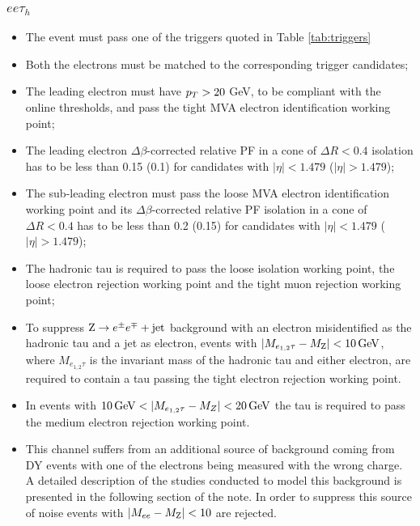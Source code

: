 \subsubsection{$ee\tau_h$}
\begin{itemize}
\item The event must pass one of the triggers quoted in Table \ref{tab:triggers} 
\item Both the electrons must be matched to the corresponding trigger candidates;
\item The leading electron must have $p_{T} > 20$ GeV, to be compliant with the online thresholds, and pass the tight MVA electron identification working point;
\item The leading electron $\Delta \beta$-corrected relative PF in a cone of $\Delta R < 0.4$ isolation has to be less than 0.15 (0.1) for candidates with $|\eta| < 1.479$ ($|\eta| > 1.479$);
\item The sub-leading electron must pass the loose MVA electron identification working point and its $\Delta \beta$-corrected relative PF isolation in a cone of $\Delta R < 0.4$ has to be less than 0.2 (0.15) for candidates with $|\eta| < 1.479$ ($|\eta| > 1.479$);
\item The hadronic tau is required to pass the loose isolation working point, the loose electron rejection working point and the tight muon rejection working point;
\item To suppress $\mathrm{Z}\rightarrow e^\pm e^\mp+\mathrm{jet}$ background with an electron misidentified as the hadronic tau and a jet as electron, events with $|M_{e_{1,2}\tau} - M_{\mathrm{Z}}| < 10\, \mathrm{GeV}$, where $M_{e_{1,2}\tau}$ is the invariant mass of the hadronic tau and either electron, are required to contain a tau passing the tight electron rejection working point.                                                                         
\item In events with $10\, \mathrm{GeV} < |M_{e_{1,2}\tau} - M_Z| < 20\, \mathrm{GeV}$ the tau is required to pass the medium electron rejection working point.                                                               
\item This channel suffers from an additional source of background coming from DY events with one of the electrons being measured with the wrong charge. A detailed                                      
description of the studies conducted to model this background is presented in the following section of the note. In order to suppress this source of noise events with $|M_{ee} - M_{\mathrm{Z}}| < 10$ are rejected.                                                                                                                                                                 
\end{itemize}


